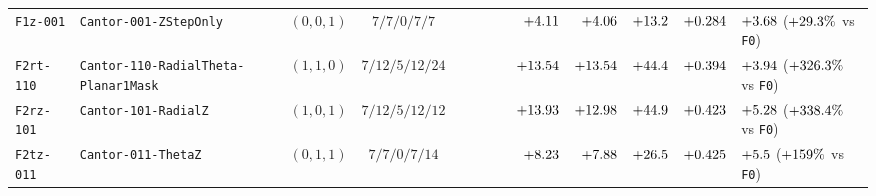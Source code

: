\begin{table}[!htbp]
{\begin{tabular}{llccrrrrrrrrl}
\texttt{F1z-001} & \texttt{Cantor-001-ZStepOnly} & $(0,0,1)$ & $7 / 7 / 0 / 7 / 7$ & \roundfour{\NthreeUnithreedFzerozerooneZAreaUmtwo} & \roundtwo{\NthreeUnithreedFzerozerooneZPedgeUm} & \roundtwo{\NthreeUnithreedFzerozerooneZAswUmtwo} & \roundone{\NthreeUnithreedFzerozerooneZGrHarmNm} & $+\roundtwo{\NthreeUnithreedFzerozerooneZFzPn}$ & $+\roundtwo{\NthreeIsothreezerofournineFzerozerooneZFzPn}$ & $+\roundone{\NthreeUnithreedFzerozerooneZFa}$ & $+\roundthree{\NthreeUnithreedFzerozerooneZFp}$ & $+\roundtwo{\NthreeUnithreedFzerozerooneZFasw}$ ($+\roundone{\NthreeUnithreedSingleEffectZPct}\%$ vs \texttt{F0}) \\
\texttt{F2rt-110} & \texttt{Cantor-110-RadialTheta-Planar1Mask} & $(1,1,0)$ & $7 / 12 / 5 / 12 / 24$ & \roundfour{\NthreeUnithreedFoneonezeroRthetaPlanarAreaUmtwo} & \roundtwo{\NthreeUnithreedFoneonezeroRthetaPlanarPedgeUm} & \roundtwo{\NthreeUnithreedFoneonezeroRthetaPlanarAswUmtwo} & \roundone{\NthreeUnithreedFoneonezeroRthetaPlanarGrHarmNm} & $+\roundtwo{\NthreeUnithreedFoneonezeroRthetaPlanarFzPn}$ & $+\roundtwo{\NthreeIsothreezerofournineFoneonezeroRthetaPlanarFzPn}$ & $+\roundone{\NthreeUnithreedFoneonezeroRthetaPlanarFa}$ & $+\roundthree{\NthreeUnithreedFoneonezeroRthetaPlanarFp}$ & $+\roundtwo{\NthreeUnithreedFoneonezeroRthetaPlanarFasw}$ ($+\roundone{\NthreeUnithreedGainFoneonezeroPlanarVsFzerozerozeroPct}\%$ vs \texttt{F0}) \\
\texttt{F2rz-101} & \texttt{Cantor-101-RadialZ} & $(1,0,1)$ & $7 / 12 / 5 / 12 / 12$ & \roundfour{\NthreeUnithreedFonezerooneRzAreaUmtwo} & \roundtwo{\NthreeUnithreedFonezerooneRzPedgeUm} & \roundtwo{\NthreeUnithreedFonezerooneRzAswUmtwo} & \roundone{\NthreeUnithreedFonezerooneRzGrHarmNm} & $+\roundtwo{\NthreeUnithreedFonezerooneRzFzPn}$ & $+\roundtwo{\NthreeIsothreezerofournineFonezerooneRzFzPn}$ & $+\roundone{\NthreeUnithreedFonezerooneRzFa}$ & $+\roundthree{\NthreeUnithreedFonezerooneRzFp}$ & $+\roundtwo{\NthreeUnithreedFonezerooneRzFasw}$ ($+\fpeval{round(100*(\NthreeUnithreedFonezerooneRzFzPn-\NthreeUnithreedFzerozerozeroFzPn)/\NthreeUnithreedFzerozerozeroFzPn,1)}\%$ vs \texttt{F0}) \\
\texttt{F2tz-011} & \texttt{Cantor-011-ThetaZ} & $(0,1,1)$ & $7 / 7 / 0 / 7 / 14$ & \roundfour{\NthreeUnithreedFzerooneoneThetazAreaUmtwo} & \roundtwo{\NthreeUnithreedFzerooneoneThetazPedgeUm} & \roundtwo{\NthreeUnithreedFzerooneoneThetazAswUmtwo} & \roundone{\NthreeUnithreedFzerooneoneThetazGrHarmNm} & $+\roundtwo{\NthreeUnithreedFzerooneoneThetazFzPn}$ & $+\roundtwo{\NthreeIsothreezerofournineFzerooneoneThetazFzPn}$ & $+\roundone{\NthreeUnithreedFzerooneoneThetazFa}$ & $+\roundthree{\NthreeUnithreedFzerooneoneThetazFp}$ & $+\roundtwo{\NthreeUnithreedFzerooneoneThetazFasw}$ ($+\fpeval{round(100*(\NthreeUnithreedFzerooneoneThetazFzPn-\NthreeUnithreedFzerozerozeroFzPn)/\NthreeUnithreedFzerozerozeroFzPn,1)}\%$ vs \texttt{F0}) \\

\end{tabular}}
\end{table}
